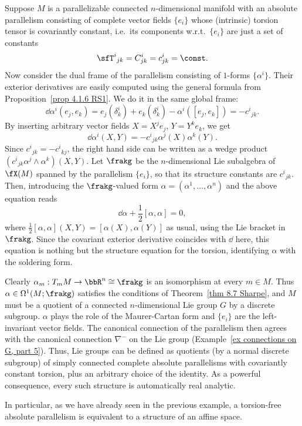 \begin{example}
    Suppose $M$ is a parallelizable connected $n$-dimensional manifold with an absolute parallelism consisting of complete vector fields $\{e_i\}$ whose (intrinsic) torsion tensor is covariantly constant, i.e.\ its components w.r.t.\ $\{e_i\}$ are just a set of constants
    \[\sfT^i{}_{jk}=C^i_{jk}=c^i_{jk}=\const.\]
    Now consider the dual frame of the parallelism consisting of $1$-forms  $\{\alpha^i\}$. Their exterior derivatives are easily computed using the general formula from Proposition~\ref{prop 4.1.6 RS1}. We do it in the same global frame:
    \[\dd\alpha^i(e_j,e_k)=e_j(\delta^i_k)+e_k(\delta^i_k)-\alpha^i([e_j,e_k])=-c^i{}_{jk}.\]
    By inserting arbitrary vector fields $X=X^j e_j$, $Y=Y^k e_k$, we get 
    \[\dd\alpha^i(X,Y)=-c^i{}_{jk}\alpha^j(X)\alpha^k(Y).\]
    Since $c^i{}_{jk}=-c^i{}_{kj}$, the right hand side can be written as a wedge product $(c^i{}_{jk}\alpha^j\wedge\alpha^k)(X,Y)$. Let $\frakg$ be the $n$-dimensional Lie subalgebra of $\fX(M)$ spanned by the parallelism $\{e_i\}$, so that its structure constants are $c^i{}_{jk}$. Then, introducing the $\frakg$-valued form $\alpha=(\alpha^1,\ldots,\alpha^n)$ and the above equation reads 
    \[\dd\alpha +\frac12[\alpha,\alpha]=0,\]
    where $\frac12[\alpha,\alpha](X,Y)=[\alpha(X),\alpha(Y)]$ as usual, using the Lie bracket in $\frakg$. Since the covariant exterior derivative coincides with $\dd$ here, this equation is nothing but the structure equation for the torsion, identifying $\alpha$ with the soldering form.

    Clearly $\alpha_m:T_mM\to \bbR^n\cong\frakg$ is an isomorphism at every $m\in M$. Thus $\alpha\in\Omega^1(M;\frakg)$ satisfies the conditions of Theorem~\ref{thm 8.7 Sharpe}, and $M$ must be a quotient of a connected $n$-dimensional Lie group $G$ by a discrete subgroup. $\alpha$ plays the role of the Maurer-Cartan form and $\{e_i\}$ are the left-invariant vector fields. The canonical connection of the parallelism then agrees with the canonical connection $\nabla^-$ on the Lie group (Example~\ref{ex connections on G, part 5}). Thus, Lie groups can be defined as quotients (by a normal discrete subgroup) of simply connected complete absolute parallelisms with covariantly constant torsion, plus an arbitrary choice of the identity. As a powerful consequence, every such structure is automatically real analytic.

    In particular, as we have already seen in the previous example, a torsion-free absolute parallelism is equivalent to a structure of an affine space.
\end{example}

